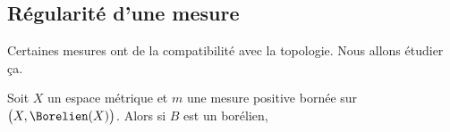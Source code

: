 \subsection{Régularité d'une mesure}

Certaines mesures ont de la compatibilité avec la topologie. Nous allons étudier ça.

\begin{theorem}     \label{ThoPKGEooVrpsGU}
    Soit \( X\) un espace métrique et \( m\) une mesure positive bornée sur \( \big(X,\Borelien(X)\big)\). Alors si \( B\) est un borélien,
\end{theorem}

